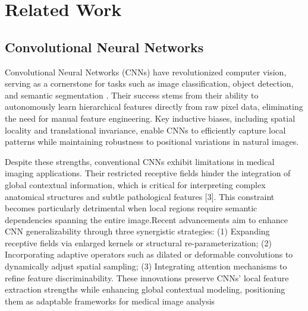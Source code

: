 \section{Related Work}
\label{sec:related}
\subsection{Convolutional Neural Networks}
Convolutional Neural Networks (CNNs) have revolutionized computer vision, serving as a cornerstone for tasks such as image classification, object detection, and semantic segmentation \cite{resnet,densenet}. Their success stems from their ability to autonomously learn hierarchical features directly from raw pixel data, eliminating the need for manual feature engineering. Key inductive biases, including spatial locality and translational invariance, enable CNNs to efficiently capture local patterns while maintaining robustness to positional variations in natural images.

Despite these strengths, conventional CNNs exhibit limitations in medical imaging applications. Their restricted receptive fields hinder the integration of global contextual information, which is critical for interpreting complex anatomical structures and subtle pathological features [3]. This constraint becomes particularly detrimental when local regions require semantic dependencies spanning the entire image.Recent advancements aim to enhance CNN generalizability through three synergistic strategies: (1) Expanding receptive fields via enlarged kernels \cite{RepLKNet,slak,pelk} or structural re-parameterization\cite{acnet,repvgg,repvit}; (2) Incorporating adaptive operators such as dilated\cite{dilated} or deformable convolutions \cite{deformablev1,deformablev2,internimage} to dynamically adjust spatial sampling; (3) Integrating attention mechanisms\cite{senet,cbam} to refine feature discriminability. These innovations preserve CNNs' local feature extraction strengths while enhancing global contextual modeling, positioning them as adaptable frameworks for medical image analysis

